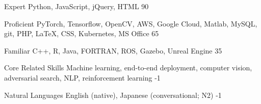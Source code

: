 



\begin{cvskills}


  \cvskill
    {Expert} %
    {Python, JavaScript, jQuery, HTML}
    {90}

  \cvskill
    {Proficient} %
    {PyTorch, Tensorflow, OpenCV, AWS, Google Cloud, Matlab, MySQL, git, PHP, LaTeX, CSS, Kubernetes, MS Office}
    {65}

  \cvskill
    {Familiar} %
    {C++, R, Java, FORTRAN, ROS, Gazebo, Unreal Engine}
    {35}


\end{cvskills}




\begin{cvskills}

  \cvskill
    {Core Related Skills} %
    {Machine learning, end-to-end deployment, computer vision, adversarial search, NLP, reinforcement learning}
    {-1}

  \cvskill
    {Natural Languages} %
    {English (native), Japanese (conversational; N2)} %
    {-1}

\end{cvskills}